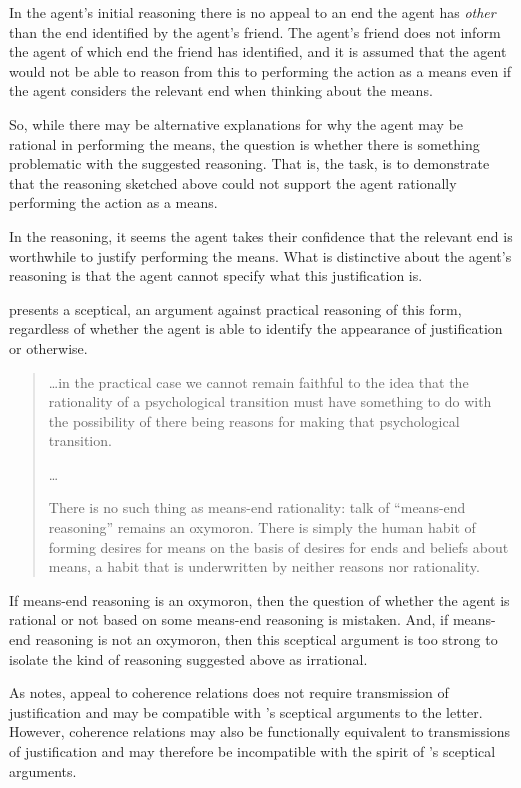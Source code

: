 \documentclass[10pt]{article}
\begin{document}
In the agent's initial reasoning there is no appeal to an end the agent has \emph{other} than the end identified by the agent's friend.
The agent's friend does not inform the agent of which end the friend has identified, and it is assumed that the agent would not be able to reason from this to performing the action as a means even if the agent considers the relevant end when thinking about the means.

So, while there may be alternative explanations for why the agent may be rational in performing the means, the question is whether there is something problematic with the suggested reasoning.
That is, the task, is to demonstrate that the reasoning sketched above could not support the agent rationally performing the action as a means.

In the reasoning, it seems the agent takes their confidence that the relevant end is worthwhile to justify performing the means.
What is distinctive about the agent's reasoning is that the agent cannot specify what this justification is.

\citeauthor{Smith:2004aa} presents a sceptical, \citeauthor{Hume:2011aa}an argument against practical reasoning of this form, regardless of whether the agent is able to identify the appearance of justification or otherwise.
\begin{quote}
  \dots in the practical case we cannot remain faithful to the idea that the rationality of a psychological transition must have something to do with the possibility of there being reasons for making that psychological transition.

  \dots

  There is no such thing as means-end rationality: talk of ``means-end reasoning'' remains an oxymoron.
  There is simply the human habit of forming desires for means on the basis of desires for ends and beliefs about means, a habit that is underwritten by neither reasons nor rationality.\nolinebreak
  \mbox{}\hfill\mbox{\citeyear[88]{Smith:2004aa}}
\end{quote}

If means-end reasoning is an oxymoron, then the question of whether the agent is rational or not based on some means-end reasoning is mistaken.
And, if means-end reasoning is not an oxymoron, then this sceptical argument is too strong to isolate the kind of reasoning suggested above as irrational.

As \citeauthor{Smith:2004aa} notes, appeal to coherence relations does not require transmission of justification and may be compatible with \citeauthor{Hume:2011aa}'s sceptical arguments to the letter.
However, coherence relations may also be functionally equivalent to transmissions of justification and may therefore be incompatible with the spirit of \citeauthor{Hume:2011aa}'s sceptical arguments.
\end{document}

